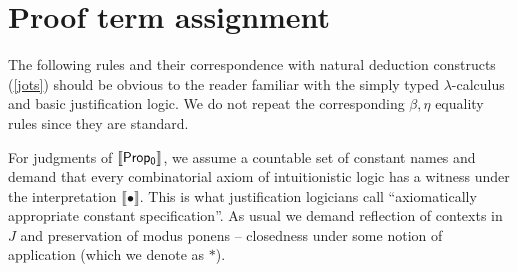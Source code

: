 \section{Proof term assignment}
\label{basicpras}
The following rules and their correspondence with natural deduction  constructs (\ref{jots}) should be obvious to the reader familiar with the simply typed  $\lambda$-calculus and basic justification logic.
We do not repeat  the corresponding $\beta, \eta$ equality rules since they are standard.
    
    For  judgments of ${\sf \llbracket Prop_0\rrbracket}$, we assume a 
    countable set of constant names and demand that every combinatorial
    axiom of intuitionistic logic has  a witness under the interpretation 
    $\llbracket\bullet\rrbracket$. This is what justification logicians call ``axiomatically appropriate constant specification''.
    As usual we demand reflection of contexts in $J$
    and preservation of modus ponens -- closedness under some notion of application (which we denote as $*$).
    
    
